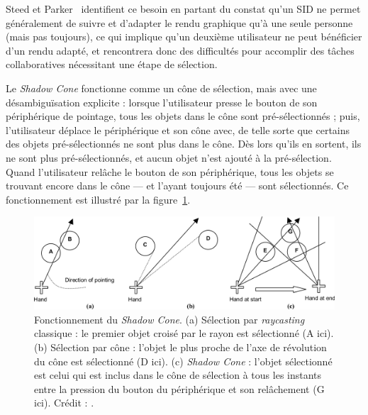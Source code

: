 	Steed et Parker~\cite{steed20043d} identifient ce besoin en partant du constat qu'un SID ne permet généralement de suivre et d'adapter le rendu graphique qu'à une seule personne (mais pas toujours\footnotemark), ce qui implique qu'un deuxième utilisateur ne peut bénéficier d'un rendu adapté, et rencontrera donc des difficultés pour accomplir des tâches collaboratives nécessitant une étape de sélection.
	
	
	Le \emph{Shadow Cone} fonctionne comme un cône de sélection, mais avec une désambiguïsation explicite : lorsque l'utilisateur presse le bouton de son périphérique de pointage, tous les objets dans le cône sont pré-sélectionnés ; puis, l'utilisateur déplace le périphérique et son cône avec, de telle sorte que certains des objets pré-sélectionnés ne sont plus dans le cône. Dès lors qu'ils en sortent, ils ne sont plus pré-sélectionnés, et aucun objet n'est ajouté à la pré-sélection. Quand l'utilisateur relâche le bouton de son périphérique, tous les objets se trouvant encore dans le cône --- et l'ayant toujours été --- sont sélectionnés. Ce fonctionnement est illustré par la figure~\ref{fig:shadow}.
	
	\begin{figure}[!htb]
		\centering
		\includegraphics[width=\textwidth]{figures/ch2/shadow}
		\caption[Fonctionnement du \emph{Shadow Cone}]{Fonctionnement du \emph{Shadow Cone}. (a) Sélection par \emph{raycasting} classique : le premier objet croisé par le rayon est sélectionné (A ici). (b) Sélection par cône : l'objet le plus proche de l'axe de révolution du cône est sélectionné (D ici). (c) \emph{Shadow Cone} : l'objet sélectionné est celui qui est inclus dans le cône de sélection à tous les instants entre la pression du bouton du périphérique et son relâchement (G ici). Crédit : \cite{steed20043d}.}
		\label{fig:shadow}
	\end{figure}
	
